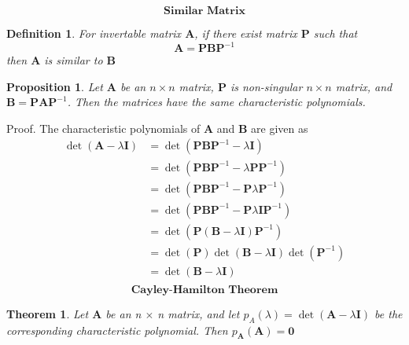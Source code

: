 \documentclass[10pt]{article}
\newtheorem{propo}{Proposition}[section]
\newtheorem{defin}{Definition}[section]
\newtheorem{theorem}{Theorem}[section]
\begin{document}
    \[ \textbf{Similar Matrix} \]
\begin{defin}
    For invertable matrix $\mathbf{A}$, if there exist matrix $\mathbf{P}$ such that
    \[ \mathbf{A}  = \mathbf{P} \mathbf{B} \mathbf{P}^{-1} \]
    then $\mathbf{A}$ is similar to $\mathbf{B}$
\end{defin}

\begin{propo}
Let $\mathbf{A}$ be an $n \times n$ matrix, $\mathbf{P}$ is non-singular $n \times n$ matrix, and
$\mathbf{B} = \mathbf{P} \mathbf{A} \mathbf{P}^{-1}$. Then the matrices have the same characteristic polynomials.
\end{propo}

Proof. The characteristic polynomials of $\mathbf{A}$ and $\mathbf{B}$ are given as 
    \begin{equation}
    \begin{aligned}
     \det (\mathbf{A} - \lambda \mathbf{I}) & = \det (\mathbf{P} \mathbf{B} \mathbf{P}^{-1} - \lambda \mathbf{I}) \\
     & = \det (\mathbf{P} \mathbf{B} \mathbf{P}^{-1} - \lambda \mathbf{P} \mathbf{P}^{-1}) \\ 
     & = \det (\mathbf{P} \mathbf{B} \mathbf{P}^{-1} - \mathbf{P} \lambda \mathbf{P}^{-1}) \\
     & = \det (\mathbf{P} \mathbf{B} \mathbf{P}^{-1} - \mathbf{P} \lambda \mathbf{I} \mathbf{P}^{-1})  \\
     & = \det (\mathbf{P} (\mathbf{B} - \lambda \mathbf{I}) \mathbf{P}^{-1}) \\
     & = \det (\mathbf{P}) \det(\mathbf{B} - \lambda \mathbf{I}) \det (\mathbf{P}^{-1}) \\
     & = \det(\mathbf{B} - \lambda \mathbf{I}) \nonumber\\
    \end{aligned}
    \end{equation}
\[ \textbf{Cayley-Hamilton Theorem} \]

\begin{theorem}
Let $\mathbf{A}$ be an n $\times$ n matrix, and let $p_{A}(\lambda) = \det(\mathbf{A} - \lambda \mathbf{I})$ be the corresponding characteristic polynomial. 
Then $p_{\mathbf{A}}(\mathbf{A}) = \mathbf{0}$
\end{theorem}
\end{document}
